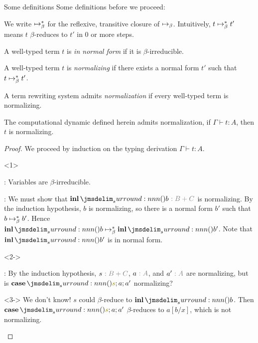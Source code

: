 \documentclass{beamer}
\begin{document}
\begin{frame}{Some definitions}
  Some definitions before we proceed:
  \begin{notation}
    We write $\bRed*$ for the reflexive, transitive closure of $\bRed$.
    Intuitively, $t \bRed* t'$ means $t$ $\beta$-reduces to $t'$ in 0 or more steps.
  \end{notation}
  \begin{definition}
    A well-typed term $t$ is \emph{in normal form} if it is $\beta$-irreducible.
  \end{definition}
  \begin{definition}
    A well-typed term $t$ is \emph{normalizing} if there exists a normal form $t'$ such that $t \bRed* t'$.
  \end{definition}
  \begin{definition}
    A term rewriting system admits \emph{normalization} if every well-typed term is normalizing.
  \end{definition}
\end{frame}

\begin{frame}{}
  \begin{theorem}\label{0003}
    The computational dynamic defined herein admits normalization, \ie if $\Gamma \vdash t : A$, then $t$ is normalizing.
  \end{theorem}
  \begin{proof}
    We proceed by induction on the typing derivation $\Gamma \vdash t : A$.
    \begin{itemize}
      \begin{onlyenv}<1>
      \item[\rVar:] Variables are $\beta$-irreducible.
      \item[\rSumIl:] We must show that $\tmInl{b}\tpAnno{B + C}$ is normalizing.
        By the induction hypothesis, $b$ is normalizing, so there is a normal form $b'$ such that $b \bRed* b'$.
        Hence $\tmInl{b} \bRed* \tmInl{b'}$.
        Note that $\tmInl{b'}$ is in normal form.
      \end{onlyenv}
      \begin{onlyenv}<2->
      \item[\rSumE:] By the induction hypothesis, $s\tpAnno{B + C}$, $a\tpAnno{A}$, and $a'\tpAnno{A}$ are normalizing, but is $\tmCase{s}{a}{a'}$ normalizing?
      \end{onlyenv}
    \end{itemize}
    \begin{onlyenv}<3->
      We don't know!
      $s$ could $\beta$-reduce to $\tmInl{b}$.
      Then $\tmCase{s}{a}{a'}$ $\beta$-reduces to $a[b/x]$, which is not \apriori normalizing.
    \end{onlyenv}
  \end{proof}
\end{frame}
\end{document}
